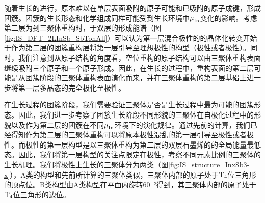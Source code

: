 随着生长的进行，原本难以在单层表面吸附的原子可能和已吸附的原子成键，形成团簇。团簇的生长形态和化学组成同样可能受到生长环境中$\it \mu_{\rm In}^{\rm } \it$变化的影响。考虑第二层为到三聚体重构时，于双层的形成能谱（图\ref{fig:IS_DFT_2LInSb_SbTonAll}）可以认为第一层混合极性的的晶体化转变开始于作为第二层的团簇重构层将第一层引导至理想极性的构型（极性或者极性）。同时，我们注意到从原子结构的角度看，空位重构的原子结构可以由三聚体重构表面继续吸附三个原子和一个原子形成。因此，在生长的过程中，重构表面的第二层可能是从团簇阶段的三聚体重构表面演化而来，并在三聚体重构的第二层基础上进一步将第一层多晶态的完全极化至极性。

在生长过程的团簇阶段，我们需要验证三聚体是否是生长过程中最为可能的团簇形态。因此，我们进一步考察了团簇生长阶段不同形貌的三聚体在自极化过程中的形貌以及作为第二层的团簇在不同$\it \mu_{\rm In}^{\rm } \it$环境下的演化规律。通过先前的计算，我们已经得知作为第二层的三聚体重构可以将原本极性混乱的第一层引导至极性或者极性。而极性的第一层构型是以三聚体重构为第二层的双层石墨烯的的全局能量最低态。因此，我们将第一层构型的关注点限定在极性，考察不同元素比例的三聚体的生长机理。我们将极性上生长的三聚体分为两类（图\ref{fig:IS_structure_InxSb3-x}），A类的构型和先前所计算的三聚体类似，三聚体内部的原子处于$\rm T_{4} \it$位三角形的顶点位。B类构型由A类构型在平面内旋转\SI{60}{\degree}得到，其三聚体内部的原子处于$\rm T_{4} \it$位三角形的边位。

